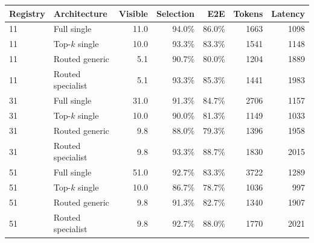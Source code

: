 \begin{tabular}{llrrrrr}
\toprule
Registry & Architecture & Visible & Selection & E2E & Tokens & Latency \\
\midrule
11 & Full single & 11.0 & 94.0\% & 86.0\% & 1663 & 1098 \\
11 & Top-$k$ single & 10.0 & 93.3\% & 83.3\% & 1541 & 1148 \\
11 & Routed generic & 5.1 & 90.7\% & 80.0\% & 1204 & 1889 \\
11 & Routed specialist & 5.1 & 93.3\% & 85.3\% & 1441 & 1983 \\
\midrule
31 & Full single & 31.0 & 91.3\% & 84.7\% & 2706 & 1157 \\
31 & Top-$k$ single & 10.0 & 90.0\% & 81.3\% & 1149 & 1033 \\
31 & Routed generic & 9.8 & 88.0\% & 79.3\% & 1396 & 1958 \\
31 & Routed specialist & 9.8 & 93.3\% & 88.7\% & 1830 & 2015 \\
\midrule
51 & Full single & 51.0 & 92.7\% & 83.3\% & 3722 & 1289 \\
51 & Top-$k$ single & 10.0 & 86.7\% & 78.7\% & 1036 & 997 \\
51 & Routed generic & 9.8 & 91.3\% & 82.7\% & 1340 & 1907 \\
51 & Routed specialist & 9.8 & 92.7\% & 88.0\% & 1770 & 2021 \\
\bottomrule
\end{tabular}
